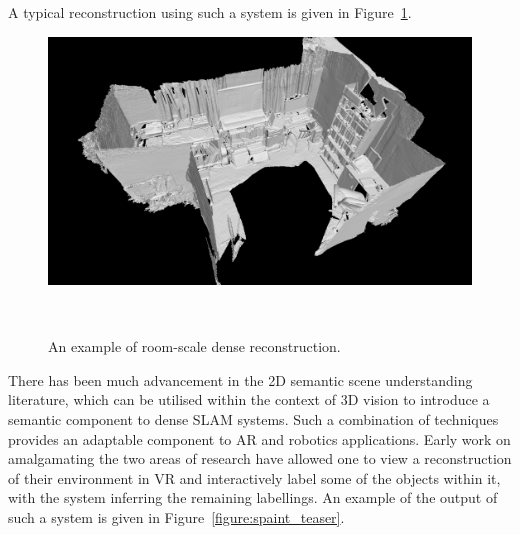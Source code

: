 A typical reconstruction using such a system is given in Figure~\ref{figure:room_recon_example}.
\begin{figure}[!htbp]
  \centering
  \includegraphics[width=.9\linewidth]{figures/intro/room_scene.png}
  \caption[Room Scale Dense Reconstruction]{An example of room-scale dense reconstruction.}
~\label{figure:room_recon_example}
\end{figure}

There has been much advancement in the 2D semantic scene understanding literature, which can be utilised within 
the context of 3D vision to introduce a semantic component to dense SLAM systems. Such a combination of techniques 
provides an adaptable component to AR and robotics applications. Early work on amalgamating the two areas of research 
have allowed one to view a reconstruction of their environment in VR and interactively label some of the objects within 
it, with the system inferring the remaining labellings. An example of the output of such a system is given 
in Figure~\ref{figure:spaint_teaser}.

